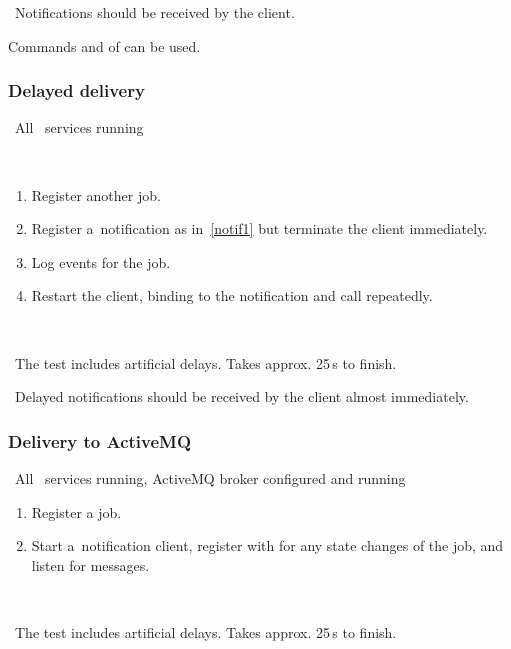 \result\ Notifications should be received by the client.

\begin{hints}
Commands  and  of 
can be used.
\end{hints}




\subsubsection{Delayed delivery}

\req\ All \LB\ services running

\what\
\begin{enumerate}
\item Register another job.
\item Register a~notification as in~\ref{notif1} but terminate the client
immediately.
\item Log events for the job.
\item Restart the client, binding to the notification and call
 repeatedly.
\end{enumerate}

\how\ 

\note\ The test includes artificial delays. Takes approx. 25\,s to finish.

\result\ Delayed notifications should be received by the client almost
immediately.


\subsubsection{Delivery to ActiveMQ}
\label{notifamq}
\req\ All \LB\ services running, ActiveMQ broker configured and running

\what
\begin{enumerate}
\item Register a job.
\item Start a~notification client,
register with  for any state changes of the job,
and listen for messages. 
\end{enumerate}

\how\ 

\note\ The test includes artificial delays. Takes approx. 25\,s to finish.

